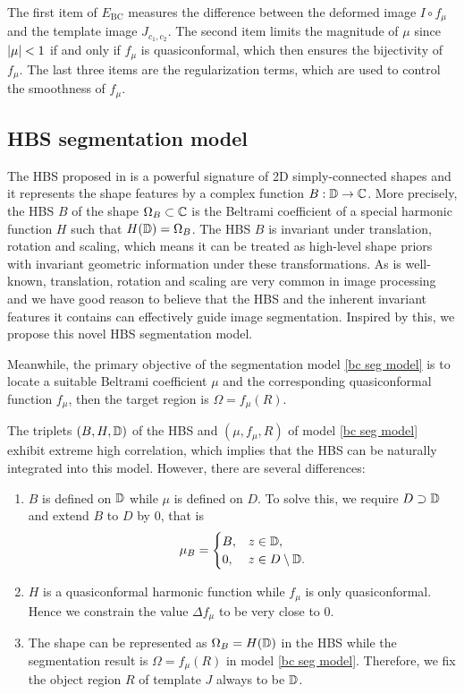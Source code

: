 \documentclass[review,onefignum,onetabnum]{siamonline190516}
\begin{document}
The first item of $E_{\text{BC}}$ measures the difference between the deformed image $I \circ f_\mu$ and the template image $J_{c_1, c_2}$. The second item limits the magnitude of $\mu$ since $\left\vert \mu \right\vert < 1$ if and only if $f_\mu$ is quasiconformal, which then ensures the bijectivity of $f_\mu$. The last three items are the regularization terms, which are used to control the smoothness of $f_\mu$.

\subsection{HBS segmentation model}
The HBS proposed in \cite{} is a powerful signature of 2D simply-connected shapes and  it represents the shape features by a complex function $B: \mathbb{D} \rightarrow \mathbb{C}$. More precisely, the HBS $B$ of the shape $\Omega_B \subset \mathbb{C}$ is the Beltrami coefficient of a special harmonic function $H$ such that $H(\mathbb{D}) = \Omega_B$. The HBS $B$ is invariant under translation, rotation and scaling, which means it can be treated as high-level shape priors with invariant geometric information under these transformations. As is well-known, translation, rotation and scaling are very common in image processing and we have good reason to believe that the HBS and the inherent invariant features it contains can effectively guide image segmentation. Inspired by this, we propose this novel HBS segmentation model.

Meanwhile, the primary objective of the segmentation model \ref{bc seg model} is to locate a suitable Beltrami coefficient $\mu$ and the corresponding quasiconformal function $f_\mu$, then the target region is $\Omega = f_\mu(R)$. 

The triplets $(B, H, \mathbb{D})$ of the HBS and $(\mu, f_\mu, R)$ of model \ref{bc seg model} exhibit extreme high correlation, which implies that the HBS can be naturally integrated into this model. However, there are several differences:
\begin{enumerate}
    \item $B$ is defined on $\mathbb{D}$ while $\mu$ is defined on $D$. To solve this, we require $D \supset \mathbb{D}$ and extend $B$ to $D$ by $0$, that is
          \begin{equation}\label{mu_B}
              \mu_B = \begin{cases}
                  B, & z \in \D,              \\
                  0, & z \in D \setminus \D.
              \end{cases}
          \end{equation}
          
    \item $H$ is a quasiconformal harmonic function while $f_\mu$ is only quasiconformal. Hence we constrain the value $\Delta f_\mu$ to be very close to $0$.
          
    \item The shape can be represented as $\Omega_B = H(\mathbb{D})$ in the HBS while the segmentation result is $\Omega = f_\mu(R)$ in model \ref{bc seg model}. Therefore, we fix the object region $R$ of template $J$ always to be $\mathbb{D}$.
\end{enumerate}
\end{document}

